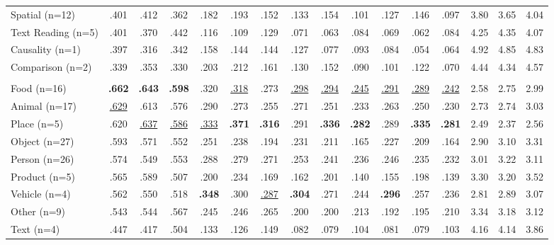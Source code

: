 \documentclass[letterpaper]{article} %
\begin{document}
\begin{table}[h]
{\begin{tabular}{lccccccccccccccc}
Spatial (n=12)  & .401 & .412 & .362 & .182 & .193 & .152 & .133 & .154 & .101 & .127 & .146 & .097 & 3.80 & 3.65 & 4.04 \\
Text Reading (n=5)  & .401 & .370 & .442 & .116 & .109 & .129 & .071 & .063 & .084 & .069 & .062 & .084 & 4.25 & 4.35 & 4.07 \\
Causality (n=1)  & .397 & .316 & .342 & .158 & .144 & .144 & .127 & .077 & .093 & .084 & .054 & .064 & 4.92 & 4.85 & 4.83 \\
Comparison (n=2)  & .339 & .353 & .330 & .203 & .212 & .161 & .130 & .152 & .090 & .101 & .122 & .070 & 4.44 & 4.34 & 4.57 \\
\addlinespace[4pt]
\midrule
\multicolumn{16}{l}{\textit{By entity type}} \\
\midrule
Food (n=16)  & \textbf{.662} & \textbf{.643} & \textbf{.598} & .320 & \underline{.318} & .273 & \underline{.298} & \underline{.294} & \underline{.245} & \underline{.291} & \underline{.289} & \underline{.242} & 2.58 & 2.75 & 2.99 \\
Animal (n=17)  & \underline{.629} & .613 & .576 & .290 & .273 & .255 & .271 & .251 & .233 & .263 & .250 & .230 & 2.73 & 2.74 & 3.03 \\
Place (n=5)  & .620 & \underline{.637} & \underline{.586} & \underline{.333} & \textbf{.371} & \textbf{.316} & .291 & \textbf{.336} & \textbf{.282} & .289 & \textbf{.335} & \textbf{.281} & 2.49 & 2.37 & 2.56 \\
Object (n=27)  & .593 & .571 & .552 & .251 & .238 & .194 & .231 & .211 & .165 & .227 & .209 & .164 & 2.90 & 3.10 & 3.31 \\
Person (n=26)  & .574 & .549 & .553 & .288 & .279 & .271 & .253 & .241 & .236 & .246 & .235 & .232 & 3.01 & 3.22 & 3.11 \\
Product (n=5)  & .565 & .589 & .507 & .200 & .234 & .169 & .162 & .201 & .140 & .155 & .198 & .139 & 3.30 & 3.20 & 3.52 \\
Vehicle (n=4)  & .562 & .550 & .518 & \textbf{.348} & .300 & \underline{.287} & \textbf{.304} & .271 & .244 & \textbf{.296} & .257 & .236 & 2.81 & 2.89 & 3.07 \\
Other (n=9)  & .543 & .544 & .567 & .245 & .246 & .265 & .200 & .200 & .213 & .192 & .195 & .210 & 3.34 & 3.18 & 3.12 \\
Text (n=4)  & .447 & .417 & .504 & .133 & .126 & .149 & .082 & .079 & .104 & .081 & .079 & .103 & 4.16 & 4.14 & 3.86 \\
\bottomrule
\end{tabular}
}%
\end{table}
\fi %
\end{document}
